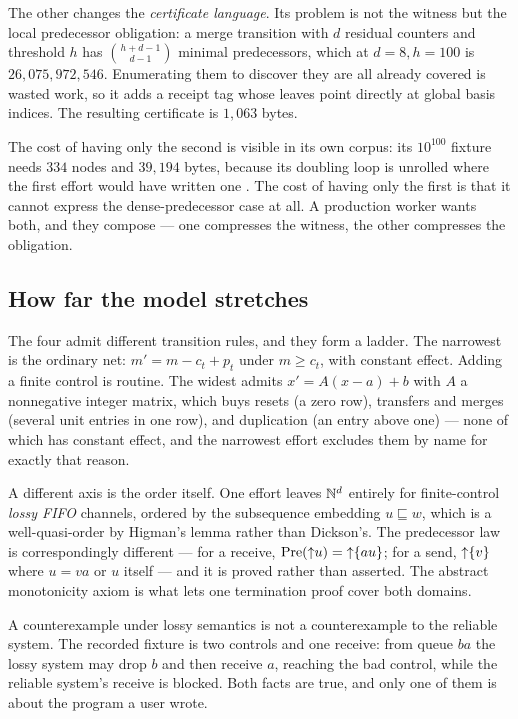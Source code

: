 The other changes the \emph{certificate language}. Its problem is not the
witness but the local predecessor obligation: a merge transition with $d$
residual counters and threshold $h$ has $\binom{h+d-1}{d-1}$ minimal
predecessors, which at $d=8,h=100$ is $26{,}075{,}972{,}546$. Enumerating them
to discover they are all already covered is wasted work, so it adds a receipt
tag whose leaves point directly at global basis indices. The resulting
certificate is $1{,}063$ bytes.

The cost of having only the second is visible in its own corpus: its
$10^{100}$ fixture needs $334$ nodes and $39{,}194$ bytes, because its doubling
loop is unrolled where the first effort would have written one .
The cost of having only the first is that it cannot express the dense-predecessor
case at all. A production worker wants both, and they compose --- one compresses
the witness, the other compresses the obligation.

\subsection{How far the model stretches}

The four admit different transition rules, and they form a ladder. The
narrowest is the ordinary net: $m'=m-c_t+p_t$ under $m\ge c_t$, with constant
effect. Adding a finite control is routine. The widest admits
$x'=A(x-a)+b$ with $A$ a nonnegative integer matrix, which buys resets (a zero
row), transfers and merges (several unit entries in one row), and duplication
(an entry above one) --- none of which has constant effect, and the narrowest
effort excludes them by name for exactly that reason.

A different axis is the order itself. One effort leaves $\mathbb{N}^d$ entirely for
finite-control \emph{lossy FIFO} channels, ordered by the subsequence embedding
$u\sqsubseteq w$, which is a well-quasi-order by Higman's lemma rather than
Dickson's. The predecessor law is correspondingly different --- for a receive,
$\operatorname{Pre}({\uparrow}u)={\uparrow}\{au\}$; for a send, ${\uparrow}\{v\}$ where $u=va$ or $u$ itself
--- and it is proved rather than asserted. The abstract monotonicity axiom is
what lets one termination proof cover both domains.

\begin{remark}
A counterexample under lossy semantics is not a counterexample to the reliable
system. The recorded fixture is two controls and one receive: from queue $ba$
the lossy system may drop $b$ and then receive $a$, reaching the bad control,
while the reliable system's receive is blocked. Both facts are true, and only
one of them is about the program a user wrote.
\end{remark}

